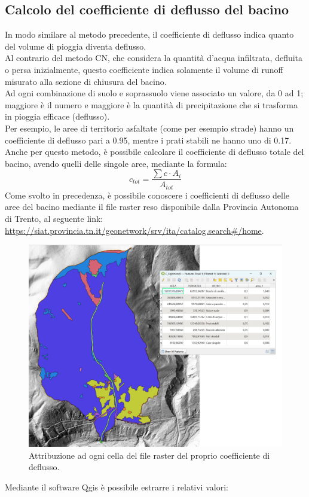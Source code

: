\subsection{Calcolo del coefficiente di deflusso del bacino}
In modo similare al metodo precedente, il coefficiente di deflusso indica quanto del volume di pioggia diventa deflusso.\\
Al contrario del metodo CN, che considera la quantità d'acqua infiltrata, defluita o persa inizialmente, questo coefficiente indica solamente il volume di runoff misurato alla sezione di chiusura del bacino.\\
Ad ogni combinazione di suolo e soprassuolo viene associato un valore, da 0 ad 1; maggiore è il numero e maggiore è la quantità di precipitazione che si trasforma in pioggia efficace (deflusso).\\
Per esempio, le aree di territorio asfaltate (come per esempio strade) hanno un coefficiente di deflusso pari a 0.95, mentre i prati stabili ne hanno uno di 0.17.\\
Anche per questo metodo, è possibile calcolare il coefficiente di deflusso totale del bacino, avendo quelli delle singole aree, mediante la formula:
\begin{equation}
    c_{tot}=\frac{\sum c \cdot A_i}{A_{tot}}
\end{equation}
Come svolto in precedenza, è possibile conoscere i coefficienti di deflusso delle aree del bacino mediante il file raster reso disponibile dalla Provincia Autonoma di Trento, al seguente link: \url{https://siat.provincia.tn.it/geonetwork/srv/ita/catalog.search#/home}.
\begin{figure}[H]  \centering
    \includegraphics[scale=0.25]{immagini/qgis_c.png}
    \caption{Attribuzione ad ogni cella del file raster del proprio coefficiente di deflusso.}
    \label{qgis_c}
\end{figure}
Mediante il software Qgis è possibile estrarre i relativi valori:

